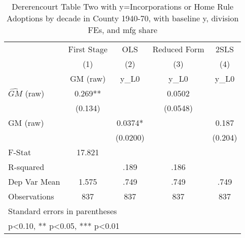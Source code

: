 \begin{table}[htbp]\centering
\def\sym#1{\ifmmode^{#1}\else\(^{#1}\)\fi}
\caption{Dererencourt Table Two with y=Incorporations or Home Rule Adoptions by decade in County 1940-70, with baseline y, division FEs, and mfg share}
\begin{tabular}{l*{4}{c}}
\toprule
                    & First Stage   &         OLS   &Reduced Form   &        2SLS   \\
                    &\multicolumn{1}{c}{(1)}&\multicolumn{1}{c}{(2)}&\multicolumn{1}{c}{(3)}&\multicolumn{1}{c}{(4)}\\
                    &\multicolumn{1}{c}{GM  (raw)}&\multicolumn{1}{c}{y\_L0}&\multicolumn{1}{c}{y\_L0}&\multicolumn{1}{c}{y\_L0}\\
\midrule
$\hat{GM}$ (raw)    &       0.269** &               &      0.0502   &               \\
                    &     (0.134)   &               &    (0.0548)   &               \\
\addlinespace
GM  (raw)           &               &      0.0374*  &               &       0.187   \\
                    &               &    (0.0200)   &               &     (0.204)   \\
\midrule
F-Stat              &      17.821   &               &               &               \\
R-squared           &               &        .189   &        .186   &               \\
Dep Var Mean        &       1.575   &        .749   &        .749   &        .749   \\
Observations        &         837   &         837   &         837   &         837   \\
\bottomrule
\multicolumn{5}{l}{\footnotesize Standard errors in parentheses}\\
\multicolumn{5}{l}{\footnotesize * p<0.10, ** p<0.05, *** p<0.01}\\
\end{tabular}
\end{table}
